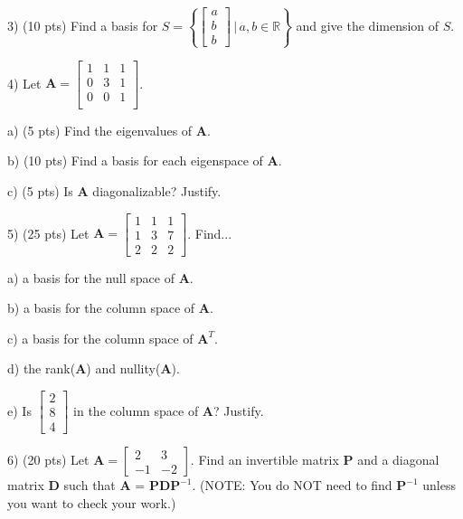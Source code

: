 \documentclass{article}
\begin{document}
\begin{flushleft}
\pagebreak

3) (10 pts) Find a basis for $S = \left\{\begin{bmatrix} a \\b \\b \end{bmatrix}  \,|\, a,b \in \mathbb{R}\right\}$ and give the dimension of $S$.

\vspace{2in}

4) Let $\textbf{A} = \begin{bmatrix}
1 & 1 & 1 \\
0 & 3 & 1 \\
0 & 0 & 1 \\
\end{bmatrix}$.

\vspace{.25in}

a) (5 pts) Find the eigenvalues of $\textbf{A}$.

\vspace{1.5in}

b) (10 pts) Find a basis for each eigenspace of $\textbf{A}$.

\vspace{3in}

c) (5 pts) Is $\textbf{A}$ diagonalizable?  Justify.

\pagebreak

5) (25 pts) Let $\textbf{A} = \begin{bmatrix}
1 & 1 & 1\\
1 & 3 & 7 \\
2 & 2 & 2
\end{bmatrix}$.  Find...

\vspace{.25in}
a) a basis for the null space of $\textbf{A}$.

\vspace{1.5in}
b) a basis for the column space of $\textbf{A}$.

\vspace{1.5in}

c) a basis for the column space of $\textbf{A}^T$.

\vspace{1.5in}

d) the rank($\textbf{A}$) and nullity($\textbf{A}$).

\vspace{1.5in}

e) Is $\begin{bmatrix}
2 \\
8 \\
4 
\end{bmatrix}$ in the column space of $\textbf{A}$?  Justify.

\pagebreak

6) (20 pts) Let $\textbf{A} = \begin{bmatrix}
2 & 3 \\
-1 & -2
\end{bmatrix}$.  Find an invertible matrix $\textbf{P}$ and a diagonal matrix $\textbf{D}$ such that $\textbf{A}$ = $\textbf{PDP}^{-1}$.  (NOTE:  You do NOT need to find $\textbf{P}^{-1}$ unless you want to check your work.)

\end{flushleft}
\end{document}
